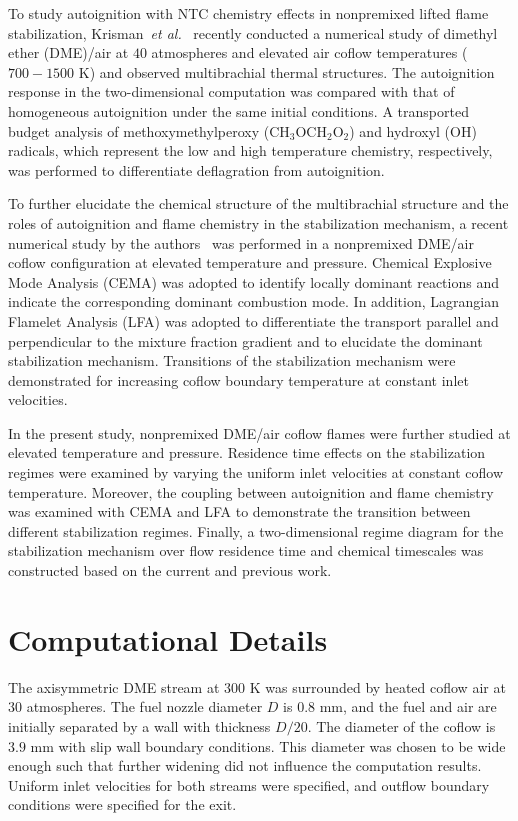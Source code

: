 \documentclass{wssci}
\begin{document}
To study autoignition with NTC chemistry effects in nonpremixed lifted flame stabilization, Krisman~\emph{et al.}~\cite{krisman14} recently conducted a numerical study of dimethyl ether (DME)/air at $40$ atmospheres and elevated air coflow temperatures ($700-1500$ K) and observed multibrachial thermal structures.  The autoignition response in the two-dimensional computation was compared with that of homogeneous autoignition under the same initial conditions.  A transported budget analysis of methoxymethylperoxy (CH$_3$OCH$_2$O$_2$) and hydroxyl (OH) radicals, which represent the low and high temperature chemistry, respectively, was performed to differentiate deflagration from autoignition.  

To further elucidate the chemical structure of the multibrachial structure and the roles of autoignition and flame chemistry in the stabilization mechanism, a recent numerical study by the authors~\cite{deng15} was performed in a nonpremixed DME/air coflow configuration at elevated temperature and pressure.  Chemical Explosive Mode Analysis (CEMA) was adopted to identify locally dominant reactions and indicate the corresponding dominant combustion mode.  In addition, Lagrangian Flamelet Analysis (LFA) was adopted to differentiate the transport parallel and perpendicular to the mixture fraction gradient and to elucidate the dominant stabilization mechanism.  Transitions of the stabilization mechanism were demonstrated for increasing coflow boundary temperature at constant inlet velocities.

In the present study, nonpremixed DME/air coflow flames were further studied at elevated temperature and pressure.  Residence time effects on the stabilization regimes were examined by varying the uniform inlet velocities at constant coflow temperature.  Moreover, the coupling between autoignition and flame chemistry was examined with CEMA and LFA to demonstrate the transition between different stabilization regimes.  Finally, a two-dimensional regime diagram for the stabilization mechanism over flow residence time and chemical timescales was constructed based on the current and previous work.                        

\section{Computational Details}

The axisymmetric DME stream at $300$ K was surrounded by heated coflow air at $30$ atmospheres.  The fuel nozzle diameter $D$ is $0.8$ mm, and the fuel and air are initially separated by a wall with thickness $D/20$.  The diameter of the coflow is $3.9$ mm with slip wall boundary conditions.  This diameter was chosen to be wide enough such that further widening did not influence the computation results.  Uniform inlet velocities for both streams were specified, and outflow boundary conditions were specified for the exit.  
\end{document}
